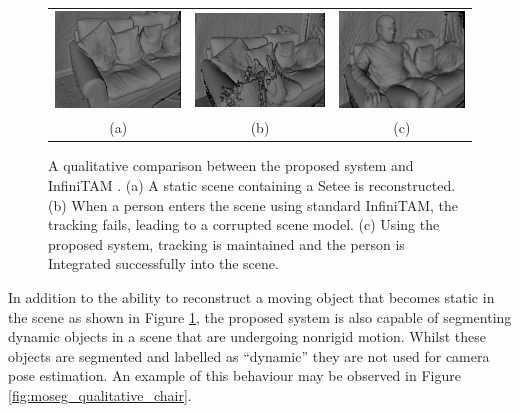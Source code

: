 \begin{figure}[ht]
  \label{fig:moseg_qualitative_setee}
  \centering
  \begin{tabular}{ccc}
    \includegraphics[height=.2\linewidth]{figures/moseg/original_sitting.png} &
    \includegraphics[height=.2\linewidth]{figures/moseg/infinitam_sitting.png} &
    \includegraphics[height=.2\linewidth]{figures/moseg/moseg_sitting.png}\\
    (a) & (b) & (c)
  \end{tabular}
  \caption[Motion Segmentation Qualitative Results I]
  {A qualitative comparison between the proposed system and InfiniTAM
    \cite{Prisacariu2014}.
    (a) A static scene containing a Setee is reconstructed.
    (b) When a person enters the scene using standard InfiniTAM, the tracking
    fails, leading to a corrupted scene model.
    (c) Using the proposed system, tracking is maintained and the person is
    Integrated successfully into the scene.}
\end{figure}

In addition to the ability to reconstruct a moving object that becomes static in
the scene as shown in Figure \ref{fig:moseg_qualitative_setee}, the proposed
system is also capable of segmenting dynamic objects in a scene that are
undergoing nonrigid motion. Whilst these objects are segmented and labelled as
``dynamic'' they are not used for camera pose estimation. An example of this
behaviour may be observed in Figure \ref{fig:moseg_qualitative_chair}.

